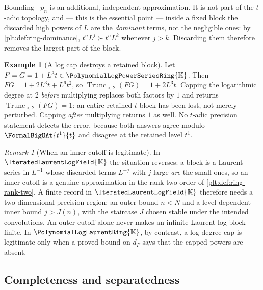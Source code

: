 \documentclass[11pt,oneside]{article}
\theoremstyle{plain}
\theoremstyle{definition}
\newtheorem{example}[theorem]{Example}
\theoremstyle{remark}
\newtheorem{remark}[theorem]{Remark}
\newcommand{\K}{\mathbb{K}}
\newcommand{\PLpow}{\PolynomialLogPowerSeriesRing{\K}}   %
\newcommand{\PLlau}{\PolynomialLogLaurentRing{\K}}       %
\newcommand{\PLit}{\IteratedLaurentLogField{\K}}         %
\DeclareMathOperator{\degL}{deg_{L}}
\newcommand{\Trunc}[2]{\operatorname{Trunc}_{<#2}#1}     %
\newcommand{\dprofile}[1]{d_{#1}}                        %
\newcommand{\succdom}{\succ}
\begin{document}
\begin{warningbox}[title={A log-degree cap is not a truncation in the dominance order}]
\label{plt:rmk:trunc-log-cutoff}
Bounding \(\degL p_n\) is an additional, independent approximation.  It is not
part of the \(t\)-adic topology, and --- this is the essential point --- inside
a fixed block the discarded high powers of \(L\) are the \emph{dominant}
terms, not the negligible ones: by
\cref{plt:def:ring-dominance}, \(t^nL^{j}\succdom t^nL^{k}\) whenever
\(j>k\).  Discarding them therefore removes the largest part of the block.
\end{warningbox}

\begin{example}[A log cap destroys a retained block]
\label{plt:ex:trunc-log-cap}
Let \(F=G=1+L^3t\in\PLpow\).  Then \(FG=1+2L^3t+L^6t^2\), so
\(\Trunc{(FG)}{2}=1+2L^3t\).  Capping the logarithmic degree at \(2\)
\emph{before} multiplying replaces both factors by \(1\) and returns
\(\Trunc{(FG)}{2}=1\): an entire retained \(t\)-block has been lost, not
merely perturbed.  Capping \emph{after} multiplying returns \(1\) as well.  No
\(t\)-adic precision statement detects the error, because both answers agree
modulo \(\FormalBigOAt{t^{1}}{t}\) and disagree at the retained level \(t^1\).
\end{example}

\begin{remark}[When an inner cutoff is legitimate]
\label{plt:rmk:trunc-inner-cutoff}
In \(\PLit\) the situation reverses: a block is a Laurent series in \(L^{-1}\)
whose discarded terms \(L^{-j}\) with \(j\) large \emph{are} the small ones,
so an inner cutoff is a genuine approximation in the rank-two order of
\cref{plt:def:ring-rank-two}.  A finite record in \(\PLit\) therefore needs a
two-dimensional precision region: an outer bound \(n<N\) and a level-dependent
inner bound \(j>J(n)\), with the staircase \(J\) chosen stable under the
intended convolutions.  An outer cutoff alone never makes an infinite
Laurent-log block finite.  In \(\PLlau\), by contrast, a log-degree cap is
legitimate only when a proved bound on \(\dprofile{F}\) says that the capped
powers are absent.
\end{remark}

\subsection{Completeness and separatedness}
\label{plt:sec:trunc-completeness}
\end{document}
